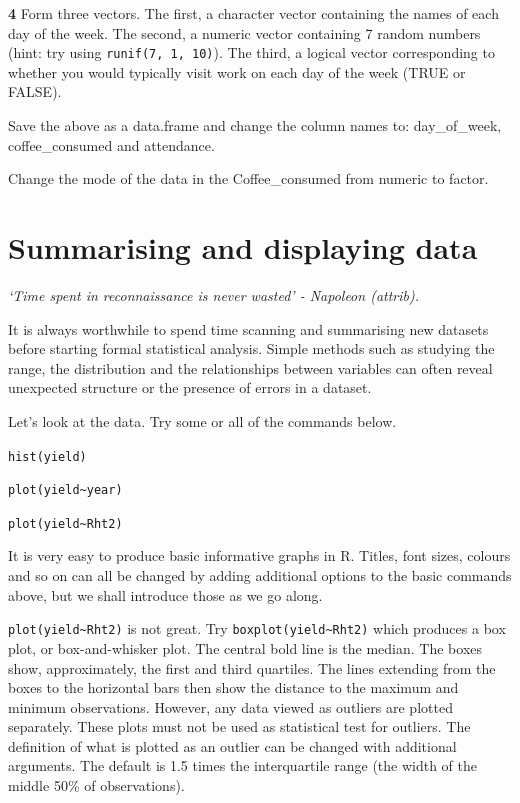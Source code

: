 \documentclass[
]{book}
\makeatletter
\newenvironment{kframe}{%
\medskip{}
\setlength{\fboxsep}{.8em}
 \def\at@end@of@kframe{}%
 \ifinner\ifhmode%
  \def\at@end@of@kframe{\end{minipage}}%
  \begin{minipage}{\columnwidth}%
 \fi\fi%
 \def\FrameCommand##1{\hskip\@totalleftmargin \hskip-\fboxsep
 \colorbox{shadecolor}{##1}\hskip-\fboxsep
     \hskip-\linewidth \hskip-\@totalleftmargin \hskip\columnwidth}%
 \MakeFramed {\advance\hsize-\width
   \@totalleftmargin\z@ \linewidth\hsize
   \@setminipage}}%
 {\par\unskip\endMakeFramed%
 \at@end@of@kframe}
\newenvironment{rmdblock}[1]
  {
  \begin{itemize}
  \renewcommand{\labelitemi}{
    \raisebox{-.7\height}[0pt][0pt]{
      {\setkeys{Gin}{width=3em,keepaspectratio}\texttt{[image: images/\#1]}}
    }
  }
  \setlength{\fboxsep}{1em}
  \begin{kframe}
  \item
  }
  {
  \end{kframe}
  \end{itemize}
  }
\newenvironment{rmdquiz}
  {\begin{rmdblock}{quiz}}
  {\end{rmdblock}}
\makeatother
\begin{document}
\begin{rmdquiz}
\textbf{4} Form three vectors. The first, a character vector containing the names of each day of the week. The second, a numeric vector containing 7 random numbers (hint: try using \texttt{runif(7,\ 1,\ 10)}). The third, a logical vector corresponding to whether you would typically visit work on each day of the week (TRUE or FALSE).

Save the above as a data.frame and change the column names to: day\_of\_week, coffee\_consumed and attendance.

Change the mode of the data in the Coffee\_consumed from numeric to factor.\\
\end{rmdquiz}

\hypertarget{summarising-and-displaying-data}{%
\section{Summarising and displaying data}\label{summarising-and-displaying-data}}

\emph{`Time spent in reconnaissance is never wasted' - Napoleon (attrib).}

It is always worthwhile to spend time scanning and summarising new datasets before starting formal statistical analysis. Simple methods such as studying the range, the distribution and the relationships between variables can often reveal unexpected structure or the presence of errors in a dataset.

Let's look at the data. Try some or all of the commands below.

\texttt{hist(yield)}

\texttt{plot(yield\textasciitilde{}year)}

\texttt{plot(yield\textasciitilde{}Rht2)}

It is very easy to produce basic informative graphs in R. Titles, font sizes, colours and so on can all be changed by adding additional options to the basic commands above, but we shall introduce those as we go along.

\texttt{plot(yield\textasciitilde{}Rht2)} is not great. Try \texttt{boxplot(yield\textasciitilde{}Rht2)} which produces a box plot, or box-and-whisker plot. The central bold line is the median. The boxes show, approximately, the first and third quartiles. The lines extending from the boxes to the horizontal bars then show the distance to the maximum and minimum observations. However, any data viewed as outliers are plotted separately. These plots must not be used as statistical test for outliers. The definition of what is plotted as an outlier can be changed with additional arguments. The default is 1.5 times the interquartile range (the width of the middle 50\% of observations).
\end{document}
